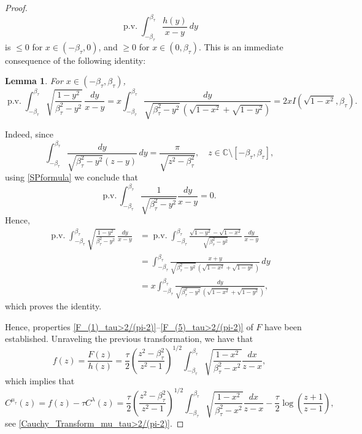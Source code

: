 \documentclass[reqno,11pt]{amsart}
\theoremstyle{plain}
\newtheorem{lem}[theorem]{Lemma}
\theoremstyle{definition}
\theoremstyle{remark}
\numberwithin{equation}{section}
\newcommand{\C}{\mathbb{C}}
\begin{document}
\begin{proof}
    \begin{equation*}\label{Int_Ineq_Sufficient_1b}
       \operatorname{p.v.}\int_{-\beta_\tau}^{\beta_\tau}\frac{h(y)}{x-y}\ dy
    \end{equation*}
    is $\leq 0$ for $x\in(-\beta_\tau,0)$, and $\geq 0$ for $x\in(0,\beta_\tau)$. This is an immediate consequence of the following identity:
    \begin{lem} \label{lem_identity}
    For $x\in (-\beta_\tau,\beta_\tau)$,
    $$
   \operatorname{p.v.} \int_{-\beta_\tau}^{\beta_\tau} \sqrt{\frac{1-y^2}{\beta_\tau^2-y^2}}\, \frac{dy}{x-y}= x \int_{-\beta_\tau}^{\beta_\tau}  \frac{dy}{\sqrt{\beta_\tau^2-y^2}\, \left(\sqrt{1-x^2} + \sqrt{1-y^2}   \right) } =2xI\left(\sqrt{1-x^2},\beta_\tau \right). 
    $$
    \end{lem}
Indeed, since
\begin{equation}\label{Int_Identity}
\int_{-\beta_\tau}^{\beta_\tau} \frac{dy}{\sqrt{\beta_\tau^2-y^2}(z-y)}\, dy=\frac{\pi}{\sqrt{z^2-\beta_\tau^2}}, \quad z\in \C\setminus[-\beta_\tau,\beta_\tau],
\end{equation}
using \eqref{SPformula} we conclude that
$$
\text{p.v.}\, \int_{-\beta_\tau}^{\beta_\tau} \frac{1}{\sqrt{\beta_\tau^2-y^2}}\frac{dy}{x-y}  =0.
$$
Hence,
\begin{align*}
    \operatorname{p.v.} \int_{-\beta_\tau}^{\beta_\tau} \sqrt{\frac{1-y^2}{\beta_\tau^2-y^2}}\, \frac{dy}{x-y} &= \operatorname{p.v.} \int_{-\beta_\tau}^{\beta_\tau} \frac{\sqrt{1-y^2}-\sqrt{1-x^2}}{\sqrt{\beta_\tau^2-y^2}}\, \frac{dy}{x-y}\\
    &= \int_{-\beta_\tau}^{\beta_\tau}  \frac{x+y}{\sqrt{\beta_\tau^2-y^2}\, \left(\sqrt{1-x^2} + \sqrt{1-y^2}   \right) }\, dy\\
    &=x \int_{-\beta_\tau}^{\beta_\tau}  \frac{dy}{\sqrt{\beta_\tau^2-y^2}\, \left(\sqrt{1-x^2} + \sqrt{1-y^2}   \right) },
\end{align*}
which proves the identity.

Hence, properties \eqref{F_(1)_tau>2/(pi-2)}--\eqref{F_(5)_tau>2/(pi-2)} of $F$ have been established. Unraveling the previous transformation, we have that 
    \begin{equation}\label{f_int_formula_tau>2/(pi-2)}
        f(z)=\frac{F(z)}{h(z)}=\frac{\tau}{2}\left(\frac{z^2-\beta_\tau^2}{z^2-1}\right)^{1/2}\int_{-\beta_\tau}^{\beta_\tau}\sqrt{\frac{1-x^2}{\beta_\tau^2-x^2}}\frac{dx}{z-x},
    \end{equation}
    which implies that
    \begin{equation*}
        C^{\mu_\tau}(z)=f(z)-\tau C^\lambda(z)= \frac{\tau}{2}\left(\frac{z^2-\beta_\tau^2}{z^2-1}\right)^{1/2}\int_{-\beta_\tau}^{\beta_\tau} \sqrt{\frac{1-x^2}{\beta_\tau^2-x^2}}\frac{dx}{z-x} -\frac{\tau}{2}\log\left(\frac{z+1}{z-1}\right),
    \end{equation*}
    see \eqref{Cauchy_Transform_mu_tau>2/(pi-2)}.
    

\end{proof}
\end{document}
